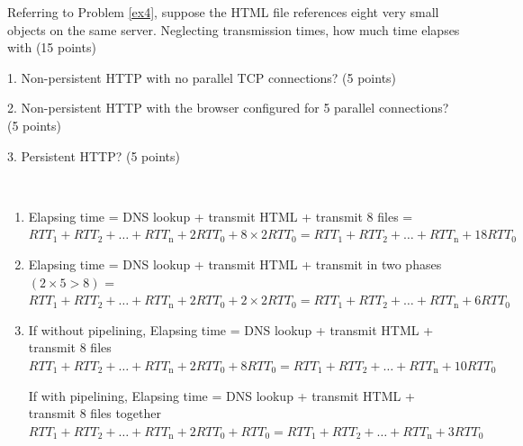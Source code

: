 \begin{exercise}[]{Referring to Problem \ref{ex4}, suppose the HTML file references eight very small objects on the same server. Neglecting transmission times, how much time elapses with (15 points)

    1. Non-persistent HTTP with no parallel TCP connections? (5 points)

    2. Non-persistent HTTP with the browser configured for 5 parallel connections? (5 points) 
    
    3. Persistent HTTP? (5 points)}
  \begin{solution}
  \par{~}
  \begin{enumerate}
      \item Elapsing time =  DNS lookup + transmit HTML + transmit 8 files = $RTT_{1}+RTT_{2}+\ldots+RTT_{\mathrm{n}} +2 RTT_{0} + 8 \times 2 RTT_{0} = RTT_{1}+RTT_{2}+\ldots+RTT_{\mathrm{n}} + 18 RTT_{0} $
      \item Elapsing time =  DNS lookup + transmit HTML + transmit in two phases $(2\times 5 > 8)$ = $RTT_{1}+RTT_{2}+\ldots+RTT_{\mathrm{n}} + 2 RTT_{0} + 2 \times 2 RTT_{0} = RTT_{1}+RTT_{2}+\ldots+RTT_{\mathrm{n}} + 6 RTT_{0} $
      \item If without pipelining, Elapsing time =  DNS lookup + transmit HTML + transmit 8 files $RTT_{1}+RTT_{2}+\ldots+RTT_{\mathrm{n}} + 2 RTT_{0} + 8 RTT_{0} = RTT_{1}+RTT_{2}+\ldots+RTT_{\mathrm{n}} + 10 RTT_{0} $
      
      If with pipelining, Elapsing time =  DNS lookup + transmit HTML + transmit 8 files together $RTT_{1}+RTT_{2}+\ldots+RTT_{\mathrm{n}} + 2 RTT_{0} + RTT_{0} = RTT_{1}+RTT_{2}+\ldots+RTT_{\mathrm{n}} + 3 RTT_{0} $
  \end{enumerate}
  \end{solution}
  \label{ex5}
\end{exercise}


